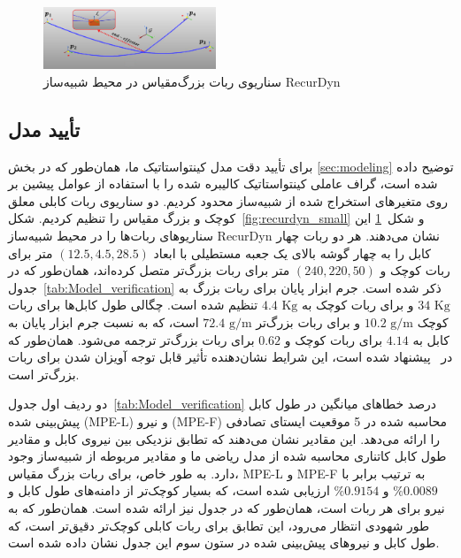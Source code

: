 \begin{figure} [b]
	\centering
	\includegraphics[width=0.46\textwidth]{img/E1_large.pdf}
	\caption{سناریوی ربات بزرگ‌مقیاس در محیط شبیه‌ساز RecurDyn}
	\label{fig:recurdyn_large}
\end{figure}

\subsection{تأیید مدل}
برای تأیید دقت مدل کینتواستاتیک ما، همان‌طور که در بخش \ref{sec:modeling} توضیح داده شده است، گراف عاملی کینتواستاتیک کالیبره شده را با استفاده از عوامل پیشین بر روی متغیرهای استخراج شده از شبیه‌ساز محدود کردیم. دو سناریوی ربات کابلی معلق کوچک و بزرگ مقیاس را تنظیم کردیم. شکل~\ref{fig:recurdyn_small} و شکل~\ref{fig:recurdyn_large} این سناریوهای ربات‌ها را در محیط شبیه‌ساز RecurDyn نشان می‌دهند. هر دو ربات چهار کابل را به چهار گوشه بالای یک جعبه مستطیلی با ابعاد $(12.5, 4.5, 28.5)$ متر برای ربات کوچک و $(240, 220, 50)$ متر برای ربات بزرگ‌تر متصل کرده‌اند، همان‌طور که در جدول~\ref{tab:Model_verification} ذکر شده است. جرم ابزار پایان برای ربات بزرگ به $34 \text{ Kg}$ و برای ربات کوچک به $4.4 \text{ Kg}$ تنظیم شده است. چگالی طول کابل‌ها برای ربات کوچک $10.2 \text{ g/m}$ و برای ربات بزرگ‌تر $72.4 \text{ g/m}$ است، که به نسبت جرم ابزار پایان به کابل به $4.14$ برای ربات کوچک و $0.62$ برای ربات بزرگ‌تر ترجمه می‌شود. همان‌طور که در~\cite{pott2013cable} پیشنهاد شده است، این شرایط نشان‌دهنده تأثیر قابل توجه آویزان شدن برای ربات بزرگ‌تر است.

دو ردیف اول جدول~\ref{tab:Model_verification} درصد خطاهای میانگین در طول کابل پیش‌بینی شده (MPE-L) و نیرو (MPE-F) محاسبه شده در 5 موقعیت ایستای تصادفی را ارائه می‌دهد. این مقادیر نشان می‌دهند که تطابق نزدیکی بین نیروی کابل و مقادیر طول کابل کاتناری محاسبه شده از مدل ریاضی ما و مقادیر مربوطه از شبیه‌ساز وجود دارد. به طور خاص، برای ربات بزرگ مقیاس، MPE-L و MPE-F به ترتیب برابر با $\%0.0089$ و $\%0.9154$ ارزیابی شده است، که بسیار کوچک‌تر از دامنه‌های طول کابل و نیرو برای هر ربات است، همان‌طور که در جدول نیز ارائه شده است. همان‌طور که به طور شهودی انتظار می‌رود، این تطابق برای ربات کابلی کوچک‌تر دقیق‌تر است، که طول کابل و نیروهای پیش‌بینی شده در ستون سوم این جدول نشان داده شده است.

